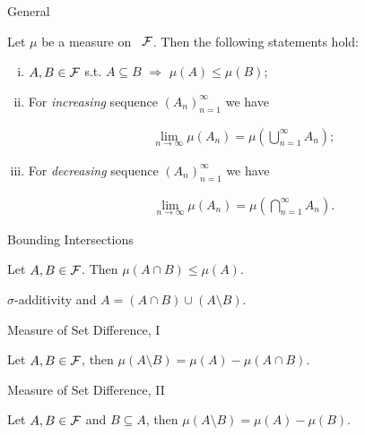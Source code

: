 \begin{proposition}{1.2}{General}

    Let $\mu$ be a measure on \SigmaAlgebra\ $\mathcal{F}$. Then the following statements hold:

        \begin{enumerate}[(i)]
            \item $A, B \in \mathcal{F}$ s.t. $A \subseteq B$ $\Rightarrow$ $\mu(A) \leq \mu(B)$;
            \item For \emph{increasing} sequence $(A_n)_{n=1}^{\infty}$ we have

                \begin{align*}
                    \lim_{n \to \infty} \mu(A_n) = \mu\left(\bigcup_{n=1}^{\infty} A_n \right);
                \end{align*}
            \item For \emph{decreasing} sequence $(A_n)_{n=1}^{\infty}$ we have

                \begin{align*}
                    \lim_{n \to \infty} \mu(A_n) = \mu\left(\bigcap_{n=1}^{\infty} A_n \right).
                \end{align*}
        \end{enumerate}

\end{proposition}

\begin{proposition}{}{Bounding Intersections}

    Let $A, B \in \mathcal{F}$. Then $\mu(A \cap B) \leq \mu(A)$.

    \Hint $\sigma$-additivity and $A = (A \cap B) \cup (A \setminus B)$.

\end{proposition}

\begin{proposition}{}{Measure of Set Difference, I}

    Let $A, B \in \mathcal{F}$, then $\mu(A \setminus B) = \mu(A) - \mu(A \cap B)$.

\end{proposition}

\begin{proposition}{}{Measure of Set Difference, II}

    Let $A, B \in \mathcal{F}$ and $B \subseteq A$, then $\mu(A \setminus B) = \mu(A) - \mu(B)$.

\end{proposition}

